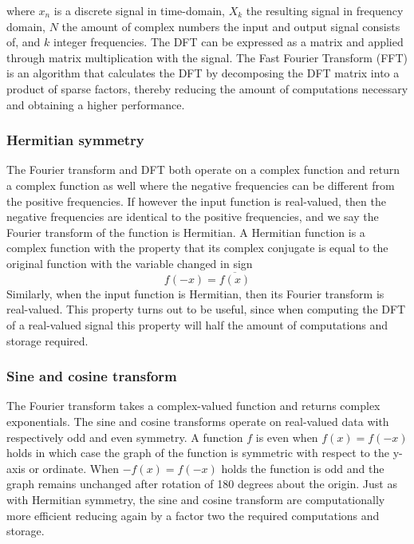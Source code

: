 where $x_n$ is a discrete signal in time-domain, $X_k$ the resulting signal in
frequency domain, $N$ the amount of complex numbers the input and output signal
consists of, and $k$ integer frequencies.
The DFT can be expressed as a matrix and applied through matrix multiplication
with the signal. The Fast Fourier Transform (FFT) is an algorithm that
calculates the DFT by decomposing the DFT matrix into a product of sparse
factors, thereby reducing the amount of computations necessary and obtaining a
higher performance.

\subsubsection{Hermitian symmetry}
The Fourier transform and DFT both operate on a complex function and return a
complex function as well where the negative frequencies can be different from
the positive frequencies. If however the input function is real-valued, then the
negative frequencies are identical to the positive frequencies, and we say the
Fourier transform of the function is Hermitian. A Hermitian function is a
complex function with the property that its complex conjugate is equal to the
original function with the variable changed in sign
\begin{equation}
 f(-x) = \overline{f(x)}
\end{equation}
Similarly, when the input function is Hermitian, then its Fourier transform is
real-valued. This property turns out to be useful, since when computing the DFT
of a real-valued signal this property will half the amount of computations and
storage required.

\subsubsection{Sine and cosine transform}
The Fourier transform takes a complex-valued function and returns complex
exponentials. The sine and cosine transforms operate on real-valued data with
respectively odd and even symmetry. A function $f$ is even when $f(x)=f(-x)$
holds in which case the graph of the function is symmetric with respect to the
y-axis or ordinate. When $-f(x)=f(-x)$ holds the function is odd and the graph
remains unchanged after rotation of 180 degrees about the origin. Just as with
Hermitian symmetry, the sine and cosine transform are computationally more
efficient reducing again by a factor two the required computations and storage.

